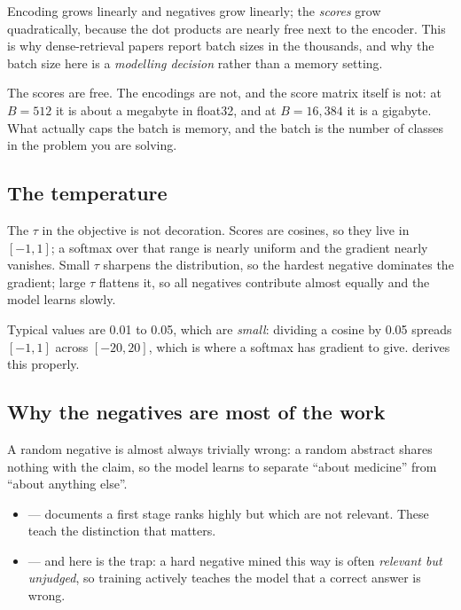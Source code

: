 \documentclass[11pt,a4paper]{article}
\begin{document}
Encoding grows linearly and negatives grow linearly; the \emph{scores} grow
quadratically, because the dot products are nearly free next to the encoder.
This is why dense-retrieval papers report batch sizes in the thousands, and why
the batch size here is a \emph{modelling decision} rather than a memory
setting.

\begin{failbox}[title={Failure condition --- ``In-batch negatives are free''}]
The scores are free. The encodings are not, and the score matrix itself is not:
at $B = 512$ it is about a megabyte in float32, and at $B = 16{,}384$ it is a
gigabyte. What actually caps the batch is memory, and the batch is the number
of classes in the problem you are solving.
\end{failbox}

\subsection{The temperature}

The $\tau$ in the objective is not decoration. Scores are cosines, so they live
in $[-1,1]$; a softmax over that range is nearly uniform and the gradient
nearly vanishes. Small $\tau$ sharpens the distribution, so the hardest
negative dominates the gradient; large $\tau$ flattens it, so all negatives
contribute almost equally and the model learns slowly.

Typical values are 0.01 to 0.05, which are \emph{small}: dividing a cosine by
0.05 spreads $[-1,1]$ across $[-20,20]$, which is where a softmax has gradient
to give.  derives this properly.

\subsection{Why the negatives are most of the work}

A random negative is almost always trivially wrong: a random abstract shares
nothing with the claim, so the model learns to separate ``about medicine'' from
``about anything else''.

\begin{itemize}[leftmargin=*,nosep]
  \item {} --- documents a first stage ranks highly but
        which are not relevant. These teach the distinction that matters.
  \item {} --- and here is the trap: a hard negative mined
        this way is often \emph{relevant but unjudged}, so training actively
        teaches the model that a correct answer is wrong.
\end{itemize}
\end{document}
